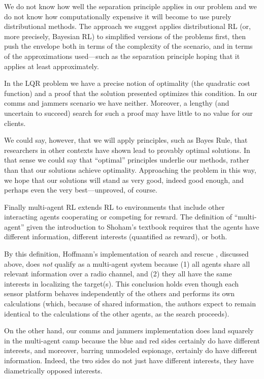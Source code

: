 \documentclass{article}
\begin{document}
We do not know how well the separation principle applies in our
problem and we do not know how computationally expensive it will
become to use purely distributional methods.  The approach we suggest
applies distributional RL (or, more precisely, Bayesian RL) to
simplified versions of the problems first, then push the envelope both
in terms of the complexity of the scenario, and in terms of the
approximations used---such as the separation principle hoping that it
applies at least approximately.

In the LQR problem we have a precise notion of optimality (the
quadratic cost function) and a proof that the solution presented
optimizes this condition.  In our comms and jammers scenario we have
neither.  Moreover, a lengthy (and uncertain to succeed) search for
such a proof may have little to no value for our clients.

We could say, however, that we will apply principles, such as Bayes
Rule, that researchers in other contexts have shown lead to provably
optimal solutions.  In that sense we could say that ``optimal''
principles underlie our methods, rather than that our solutions
achieve optimality.  Approaching the problem in this way, we hope that
our solutions will stand as very good, indeed good enough, and perhaps
even the very best---unproved, of course.

Finally multi-agent RL \cite{bucsoniu2010multi} extends RL to
environments that include other interacting agents cooperating or
competing for reward.  The definition of ``multi-agent'' given the
introduction to Shoham's textbook \cite{shoham2008multiagent} requires
that the agents have different information, different interests
(quantified as reward), or both.

By this definition, Hoffmann's implementation of search and rescue
\cite{hoffmann2009mobile}, discussed above, does \emph{not} qualify as
a multi-agent system because (1) all agents share all relevant
information over a radio channel, and (2) they all have the same
interests in localizing the target(s).  This conclusion holds even
though each sensor platform behaves independently of the others and
performs its own calculations (which, because of shared information,
the authors expect to remain identical to the calculations of the
other agents, as the search proceeds).

On the other hand, our comms and jammers implementation does land
squarely in the multi-agent camp because the blue and red sides
certainly do have different interests, and moreover, barring unmodeled
espionage, certainly do have different information.  Indeed, the two
sides do not just have different interests, they have diametrically
opposed interests.
\end{document}
